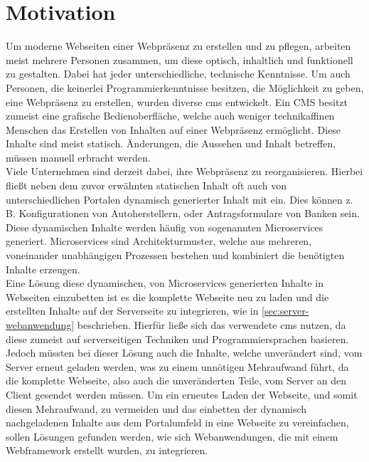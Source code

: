\section{Motivation}

Um moderne Webseiten einer Webpräsenz zu erstellen und zu pflegen, arbeiten meist mehrere Personen zusammen, um diese optisch, inhaltlich und funktionell zu gestalten. Dabei hat jeder unterschiedliche, technische Kenntnisse. Um auch Personen, die keinerlei Programmierkenntnisse besitzen, die Möglichkeit zu geben, eine Webpräsenz zu erstellen, wurden diverse \ac{cms} entwickelt. Ein CMS besitzt zumeist eine grafische Bedienoberfläche, welche auch weniger technikaffinen Menschen das Erstellen von Inhalten auf einer Webpräsenz ermöglicht. Diese Inhalte sind meist statisch. Änderungen, die Aussehen und Inhalt betreffen, müssen manuell erbracht werden. \\
Viele Unternehmen sind derzeit dabei, ihre Webpräsenz zu reorganisieren. Hierbei fließt neben dem zuvor erwähnten statischen Inhalt oft auch von unterschiedlichen Portalen dynamisch generierter Inhalt mit ein. Dies können z. B. Konfigurationen von Autoherstellern, oder Antragsformulare von Banken sein. Diese dynamischen Inhalte werden häufig von sogenannten Microservices generiert. Microservices sind Architekturmuster, welche aus mehreren, voneinander unabhängigen Prozessen bestehen und kombiniert die benötigten Inhalte erzeugen. \\
Eine Lösung diese dynamischen, von Microservices generierten Inhalte in Webseiten einzubetten ist es die komplette Webseite neu zu laden und die erstellten Inhalte auf der Serverseite zu integrieren, wie in \autoref{sec:server-webanwendung} beschrieben. Hierfür ließe sich das verwendete \ac{cms} nutzen, da diese zumeist auf serverseitigen Techniken und Programmiersprachen basieren. Jedoch müssten bei dieser Lösung auch die Inhalte, welche unverändert sind, vom Server erneut geladen werden, was zu einem unnötigen Mehraufwand führt, da die komplette Webseite, also auch die unveränderten Teile, vom Server an den Client gesendet werden müssen. Um ein erneutes Laden der Webseite, und somit diesen Mehraufwand, zu vermeiden und das einbetten der dynamisch nachgeladenen Inhalte aus dem Portalumfeld in eine Webseite zu vereinfachen, sollen Lösungen gefunden werden, wie sich Webanwendungen, die mit einem Webframework erstellt wurden, zu integrieren.